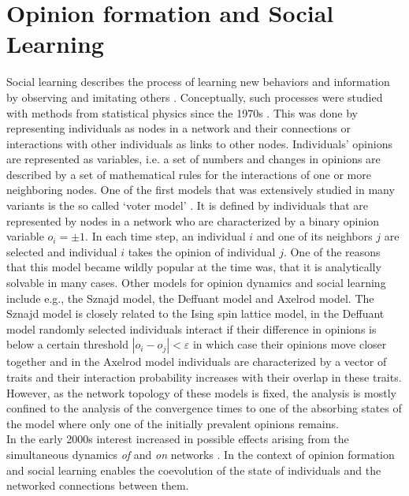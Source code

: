 \section{Opinion formation and Social Learning}
Social learning describes the process of learning new behaviors and information by observing and imitating others \citep{Bandura1971}. 
Conceptually, such processes were studied with methods from statistical physics since the 1970s \citep[for a review see e.g.][]{castellano2009statistical}. This was done by representing individuals as nodes in a network and their connections or interactions with other individuals as links to other nodes. Individuals' opinions are represented as  variables, i.e. a set of numbers and changes in opinions are described by a set of mathematical rules for the interactions of one or more neighboring nodes. One of the first models that was extensively studied in many variants is the so called `voter model' \citep{Clifford1973, Holley1975}. It is defined by individuals that are represented by nodes in a network who are characterized by a binary opinion variable $o_i = \pm 1$. In each time step, an individual $i$ and one of its neighbors $j$ are selected and individual $i$ takes the opinion of individual $j$. One of the reasons that this model became wildly popular at the time was, that it is analytically solvable in many cases. 
Other models for opinion dynamics and social learning include e.g., the Sznajd model, the Deffuant model and Axelrod model. The Sznajd model \citep{Sznajd-Weron2000} is closely related to the Ising spin lattice model, in the Deffuant model \citep{Deffuant2000} randomly selected individuals interact if their difference in opinions is below a certain threshold $|o_i - o_j| < \varepsilon$ in which case their opinions move closer together and in the Axelrod model \citep{Axelrod1997} individuals are characterized by a vector of traits and their interaction probability increases with their overlap in these traits. However, as the network topology of these models is fixed, the analysis is mostly confined to the analysis of the convergence times to one of the absorbing states of the model where only one of the initially prevalent opinions remains.\\
In the early 2000s interest increased in possible effects arising from the simultaneous dynamics \emph{of} and \emph{on} networks \citep[for a review see][]{Gross2008}. In the context of opinion formation and social learning enables the coevolution of the state of individuals and the networked connections between them.\\

